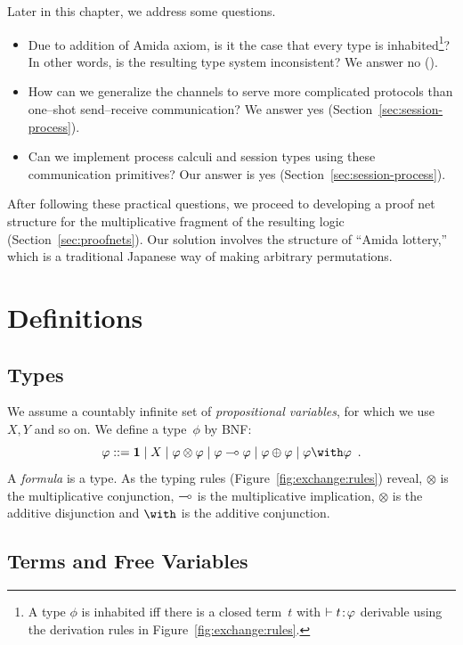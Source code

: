 Later in this chapter, we address some questions.
\begin{itemize}
 \item Due to addition of Amida axiom, is it the case that
       every type is inhabited\footnote{A type $\phi$ is inhabited iff
       there is a closed term~$t$ with $\vdash {t} \mathord{\colon\kern -2pt}{\varphi}$ derivable
       using the derivation rules in Figure~\ref{fig:exchange:rules}.}?
       In other words,
       is the resulting type system inconsistent?  We answer no ().
 \item How can we generalize the channels to serve more complicated
       protocols than one--shot send--receive communication?  We answer
       yes (Section~\ref{sec:session-process}).
 \item Can we implement process calculi and session types using these communication
       primitives?  Our answer is yes (Section~\ref{sec:session-process}).
\end{itemize}

After following these practical questions,
we proceed to developing a proof net structure for the multiplicative
fragment of the resulting logic
(Section~\ref{sec:proofnets}).
Our solution involves the structure of
``Amida lottery,'' which is a traditional
Japanese way of making arbitrary permutations.

\section{Definitions}

\subsection{Types}
We assume a countably infinite set of \textit{propositional
variables}, for which
we use $X,Y$ and so on.
We define a type~$\phi$ by BNF:
\[
 \phi::=\one \mid X \mid \phi\otimes\phi\mid \phi\limp\phi\mid
 \phi\oplus\phi\mid \phi\with\phi\enspace.
\]
A \textit{formula} is a type.
As the typing rules (Figure~\ref{fig:exchange:rules}) reveal,
$\otimes$ is the multiplicative conjunction,
$\multimap$ is the multiplicative implication,
$\otimes$ is the additive disjunction and
$\with$ is the additive conjunction.

\subsection{Terms and Free Variables}

